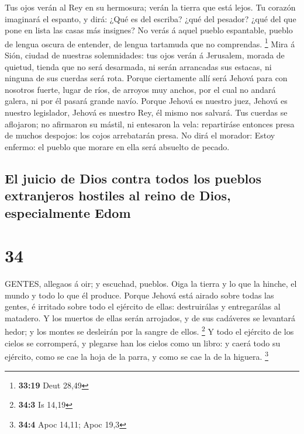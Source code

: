 Tus ojos verán al Rey en su hermosura; verán la tierra que
está lejos.  Tu corazón imaginará el espanto, y dirá: ¿Qué
es del escriba? ¿qué del pesador? ¿qué del que pone en lista las casas
más insignes?  No verás á aquel pueblo espantable, pueblo
de lengua oscura de entender, de lengua tartamuda que no comprendas.
\footnote{\textbf{33:19} Deut 28,49}  Mira á Sión, ciudad
de nuestras solemnidades: tus ojos verán á Jerusalem, morada de quietud,
tienda que no será desarmada, ni serán arrancadas sus estacas, ni
ninguna de sus cuerdas será rota.  Porque ciertamente allí
será Jehová para con nosotros fuerte, lugar de ríos, de arroyos muy
anchos, por el cual no andará galera, ni por él pasará grande navío.
 Porque Jehová es nuestro juez, Jehová es nuestro
legislador, Jehová es nuestro Rey, él mismo nos salvará. 
Tus cuerdas se aflojaron; no afirmaron su mástil, ni entesaron la vela:
repartiráse entonces presa de muchos despojos: los cojos arrebatarán
presa.  No dirá el morador: Estoy enfermo: el pueblo que
morare en ella será absuelto de pecado.

\hypertarget{el-juicio-de-dios-contra-todos-los-pueblos-extranjeros-hostiles-al-reino-de-dios-especialmente-edom}{%
\subsection{El juicio de Dios contra todos los pueblos extranjeros
hostiles al reino de Dios, especialmente
Edom}\label{el-juicio-de-dios-contra-todos-los-pueblos-extranjeros-hostiles-al-reino-de-dios-especialmente-edom}}

\hypertarget{section-33}{%
\section{34}\label{section-33}}

 GENTES, allegaos á oir; y escuchad, pueblos. Oiga la tierra
y lo que la hinche, el mundo y todo lo que él produce. 
Porque Jehová está airado sobre todas las gentes, é irritado sobre todo
el ejército de ellas: destruirálas y entregarálas al matadero.
 Y los muertos de ellas serán arrojados, y de sus cadáveres
se levantará hedor; y los montes se desleirán por la sangre de ellos.
\footnote{\textbf{34:3} Is 14,19}  Y todo el ejército de los
cielos se corromperá, y plegarse han los cielos como un libro: y caerá
todo su ejército, como se cae la hoja de la parra, y como se cae la de
la higuera. \footnote{\textbf{34:4} Apoc 14,11; Apoc 19,3}

